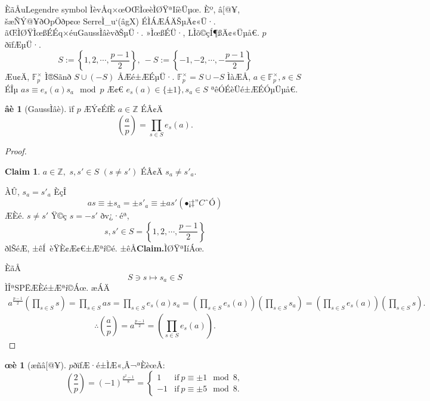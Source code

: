 \documentclass{jsarticle}
\theoremstyle{definition}
\newtheorem*{proposition*}{œè}
\newtheorem*{lemma*}{âè}
\newtheorem*{claim*}{Claim}
\newcommand{\Z}{\mathbb{Z}}
\newcommand{\F}{\mathbb{F}}
\begin{document}
ÈãÅuLegendre symbol ÌèvÅq×œOŒÌœèÌØŸªIíèÜµœ.
Èº, â[@¥, šæÑÝ@¥ðOpÖðp¢œ SerreÌ_u`(âgX) ÉÌÁÆÁÄŠµÄ¢«Ü·. ãŒÌØŸÌœßÉÉq×éuGaussÌâèvðŠµÜ·.
»ÌœßÉÜ·, LÌõ©çÍ¶ßÄ¢«Üµå€.
$p$ ðïfÆµÜ·.
\[
S:=\left\{ 1,2,\cdots,\frac{p-1}{2} \right\},\ -S:=\left\{ -1,-2,\cdots,-\frac{p-1}{2} \right\}
\]
Æu¢Ä, $\F_{p}^\times$ Ì®Sã\nð
$S\cup (-S)$ ÅÆé±ÆÉµÜ·.
$\F_{p}^\times =S\cup -S$ ÌàÆÅ, $a\in \F_{p}^\times , s\in S$ ÉÎµ
$as\equiv e_{s}(a)s_{a}\mod p$ Æ¢€ $e_{s}(a)\in \{\pm 1\}, s_{a}\in S$ ªêÓÉèÜé±ÆÉÓµÜµå€.
\begin{lemma*}[GaussÌâè]
ïf $p$ ÆÝ¢ÉfÈ $a\in \Z$ ÉÂ¢Ä
\[
\left(\frac{a}{p}\right)=\prod_{s\in S}e_{s}(a).
\]
\end{lemma*}
\begin{proof}
\begin{claim*}
$a\in \Z,$ $s,s'\in S$ $(s\neq s')$ ÉÂ¢Ä
$s_{a}\neq s'_{a}.$
\end{claim*}
ÀÛ, $s_{a}= s'_{a}$ ÈçÎ
\[
as \equiv \pm s_a=\pm s'_{a}\equiv \pm as' (¡CÓ)
\]
ÆÈé. $s\neq s'$ Ÿ©ç $s=-s'$ ðv¿·éª,
\[
s,s'\in S=\left\{1,2,\cdots, \frac{p-1}{2}\right\}
\]
ðlŠéÆ, ±êÍ èŸÈ¢Æ¢€±Æªí©é. ±êÅ\textbf{Claim.}ÌØŸªIíÁœ.

ÈãÅ
\[
S\ni s\longmapsto s_{a}\in S
\]
ÌÎªSPËÆÈé±Æªí©Áœ.
æÁÄ
\begin{align*}
a^{\frac{p-1}{2}}\left(\prod_{s\in S}s \right)=\prod_{s\in S}as=\prod_{s\in S}e_{s}(a)s_a
=\left(\prod_{s\in S} e_s(a) \right)\left(\prod_{s\in S}s_a \right)=\left(\prod_{s\in S} e_s(a) \right)\left(\prod_{s\in S}s \right).
\end{align*}
\[
\therefore \left(\frac{a}{p}\right)=a^{\frac{p-1}{2}}=\left(\prod_{s\in S} e_s(a) \right).
\]
\end{proof}
\begin{proposition*}[æñâ[@¥]
$p$ðïfÆ·é±ÌÆ«,Â¬ªÈèœÂ:
\[
\left(\frac{2}{p}\right)
=(-1)^{\frac{p^2-1}{8}}
=
\begin{cases}
1   &  \mathrm{if}\ p\equiv \pm 1\mod 8,
\\
-1  &  \mathrm{if}\ p\equiv \pm 5\mod 8.
\end{cases}
\]
\end{proposition*}
\end{document}
